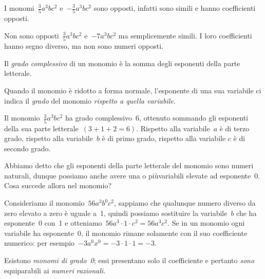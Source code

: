 \begin{exrig}
 \begin{esempio}
I monomi~$\frac{3}{5}a^{3}bc^{2}$ e~$-{\frac{3}{5}}a^{3}bc^{2}$ sono opposti, infatti sono simili e hanno
coefficienti opposti.
\end{esempio}

\begin{esempio}
Non sono opposti~$\frac{3}{5}a^{3}bc^{2}$ e~$-7a^{3}bc^{2}$ ma semplicemente simili. I loro coefficienti hanno segno diverso, ma
non sono numeri opposti.
\end{esempio}
\end{exrig}


\begin{definizione}
Il \emph{grado complessivo} di un monomio è la somma degli esponenti della parte letterale.

Quando il monomio è ridotto a forma normale, l'esponente di una sua variabile ci indica il
\emph{grado} del monomio \emph{rispetto a quella variabile}.
\end{definizione}

\begin{exrig}
 \begin{esempio}
Il monomio~$\frac{3}{5}a^{3}bc^{2}$ ha grado complessivo~6,
ottenuto sommando gli esponenti della sua parte letterale~$(3+1+2=6)$.
Rispetto alla variabile~$a$ è di terzo grado, rispetto alla
variabile~$b$ è di primo grado, rispetto alla variabile
$c$ è di secondo grado.
 \end{esempio}
\end{exrig}

Abbiamo detto che gli esponenti della parte letterale del monomio sono
numeri naturali, dunque possiamo anche avere una o piùvariabili
elevate ad esponente~0. Cosa succede allora nel monomio?

Consideriamo il monomio~$56a^{3}b^{0}c^{2}$, sappiamo che qualunque
numero diverso da zero elevato a zero è uguale a~1, quindi possiamo
sostituire la variabile~$b$ che ha esponente~0 con~1 e
otteniamo~$56a^{3}\cdot 1\cdot c^{2}=56a^{3}c^{2}$. Se in un monomio ogni
variabile ha esponente~0, il monomio rimane solamente con il suo
coefficiente numerico: per esempio~$-3a^{0}x^{0}=-3\cdot 1\cdot 1=-3$.

\osservazione Esistono \emph{monomi di grado~0}; essi presentano solo il
coefficiente e pertanto \emph{sono} equiparabili ai \emph{numeri razionali}.

